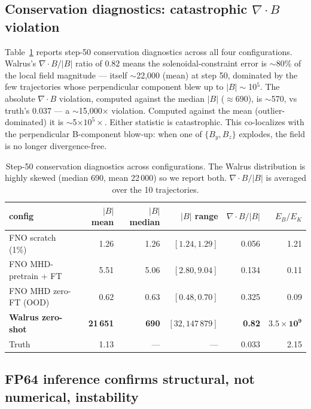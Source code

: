 \documentclass{article}
\begin{document}
\subsection{Conservation diagnostics: catastrophic $\nabla\cdot B$ violation}

Table~\ref{tab:conservation} reports step-50 conservation diagnostics across all four configurations. Walrus's $\nabla\cdot B / |B|$ ratio of $0.82$ means the solenoidal-constraint error is $\sim$80\% of the local field magnitude --- itself $\sim$22,000 (mean) at step 50, dominated by the few trajectories whose perpendicular component blew up to $|B|\sim$10$^5$. The absolute $\nabla\cdot B$ violation, computed against the median $|B|$ ($\approx 690$), is $\sim$570, vs truth's $0.037$ --- a $\sim$15,000$\times$ violation. Computed against the mean (outlier-dominated) it is $\sim$5$\times 10^5\times$. Either statistic is catastrophic. This co-localizes with the perpendicular B-component blow-up: when one of $\{B_y, B_z\}$ explodes, the field is no longer divergence-free.

\begin{table}[t]
  \centering
  \small
  \caption{Step-50 conservation diagnostics across configurations. The Walrus distribution is highly skewed (median 690, mean 22\,000) so we report both. $\nabla\cdot B / |B|$ is averaged over the 10 trajectories.}
  \label{tab:conservation}
  \begin{tabular}{l|rrrrr}
    \toprule
    config & $|B|$ mean & $|B|$ median & $|B|$ range & $\nabla\cdot B / |B|$ & $E_B / E_K$ \\
    \midrule
    FNO scratch (1\%)         & 1.26      & 1.26 & $[1.24, 1.29]$    & 0.056 & 1.21 \\
    FNO MHD-pretrain + FT     & 5.51      & 5.06 & $[2.80, 9.04]$    & 0.134 & 0.11 \\
    FNO MHD zero-FT (OOD)     & 0.62      & 0.63 & $[0.48, 0.70]$    & 0.325 & 0.09 \\
    \textbf{Walrus zero-shot} & \textbf{21\,651} & \textbf{690} & $[32, 147\,879]$ & \textbf{0.82} & $\mathbf{3.5 \times 10^9}$ \\
    Truth                     & 1.13      & ---  & ---               & 0.033 & 2.15 \\
    \bottomrule
  \end{tabular}
\end{table}

\subsection{FP64 inference confirms structural, not numerical, instability}
\end{document}
